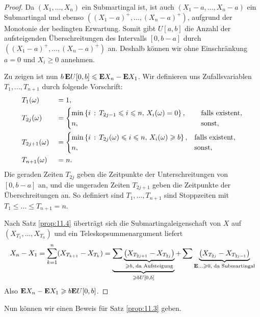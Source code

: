 \begin{proof}
Da $(X_1,\ldots,X_n)$ ein Submartingal ist, ist auch $(X_1-a,\ldots,X_n-a)$
ein Submartingal und ebenso $((X_1-a)^+,\ldots,(X_n-a)^+)$, aufgrund der
Monotonie der bedingten Erwartung. Somit gibt $U[a,b]$ die Anzahl der
aufsteigenden Überschreitungen des Intervalls $[0,b-a]$ durch
$((X_1-a)^+,\ldots,(X_n-a)^+)$ an. Deshalb können wir ohne Einschränkung $a=0$
und $X_i \ge 0$ annehmen.

Zu zeigen ist nun $b\,\textbf{E} U[0,b] \leqslant \textbf{E} X_n - \textbf{E} X_1$. Wir definieren uns
Zufallsvariablen $T_1,\ldots,T_{n+1}$ durch folgende Vorschrift:
\begin{align*}
&T_1(\omega) &&= 1,\\
&T_{2j}(\omega) &&= 
\begin{cases}
\min\left\{ i\,:\,T_{2j-1}\leqslant i\leqslant n,\,X_i(\omega)=0\right\},\quad\; &
\text{falls existent},\\
n, & \text{sonst},
\end{cases}\\
&T_{2j+1}(\omega) &&=
\begin{cases}
\min\left\{ i\,:\,T_{2j}(\omega)\leqslant i \leqslant n,\,X_i(\omega)\geqslant b\right\},
& \text{falls existent},\\
n, & \text{sonst},
\end{cases}\\
&T_{n+1}(\omega) &&= n.
\end{align*}
Die geraden Zeiten $T_{2j}$ geben die Zeitpunkte der
Unterschreitungen von $[0,b-a]$ an, und die ungeraden Zeiten $T_{2j+1}$ geben
die Zeitpunkte der Überschreitungen an. So definiert sind $T_1,\ldots,T_{n+1}$
sind Stoppzeiten mit $T_1\le \ldots\le T_{n+1}=n$. 

Nach Satz \ref{prop:11.4} überträgt sich die Submartingaleigenschaft von $X$ auf
$(X_{T_1},\ldots,X_{T_n})$ und ein Teleskopsummenargument liefert
\begin{align*}
X_n - X_1 = \sum_{k=1}^n (X_{T_{k+1}}-X_{T_k})
= \underbrace{\sum\underbrace{\left(X_{T_{2j+1}} -
X_{T_{2j}}\right)}_{\geqslant b,\; \text{da Aufsteigung}}}_{\geqslant bU[0,b]} + 
\sum\underbrace{\left(X_{T_{2j}} -
X_{T_{2j-1}}\right)}_{\textbf{E} \ldots \geqslant 0, \;\text{da Submartingal}}
\end{align*}
Also $\textbf{E} X_n - \textbf{E} X_1 \geqslant b\textbf{E} U[0,b]$.\qedhere
\end{proof}

Nun können wir einen Beweis für Satz \ref{prop:11.3} geben.

